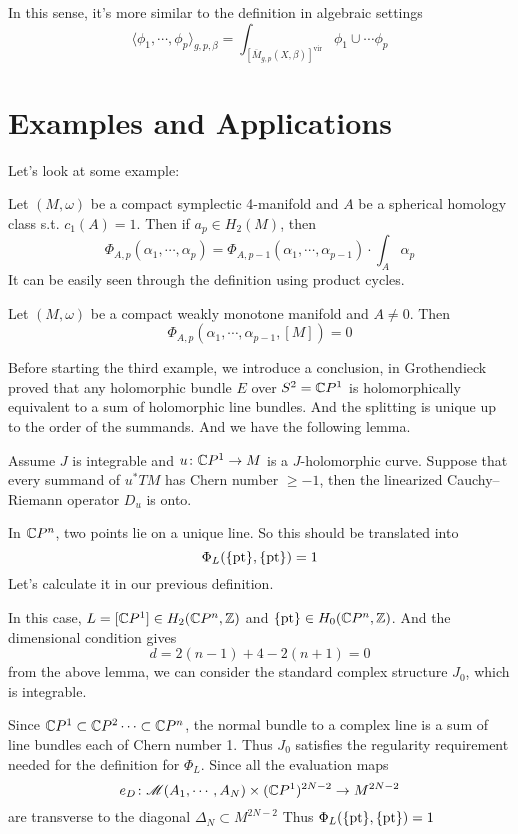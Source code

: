 \documentclass[twoside]{article}
\begin{document}
In this sense, it's more similar to the definition in algebraic settings
\[\langle \phi_1,\cdots,\phi_p \rangle_{g,p,\beta}=\int_{\left[\overline{M}_{g,p}(X,\beta)\right]^{\textrm{vir}}} \phi_1\cup\cdots\phi_p \]

\section{Examples and Applications}

Let's look at some example:

\begin{example}
    Let $(M,\omega)$ be a compact symplectic 4-manifold and $A$ be a spherical homology class 
    s.t. $c_1(A)=1$. Then if $a_p\in H_2(M)$, then
    \[\Phi_{A,p}(\alpha_1,\cdots,\alpha_p)=\Phi_{A,p-1}(\alpha_1,\cdots,\alpha_{p-1})\cdot \int_A \alpha_p\]
    It can be easily seen through the definition using product cycles.
\end{example}

\begin{example}
    Let $(M,\omega)$ be a compact weakly monotone manifold and $A\neq 0$. Then
    \[\Phi_{A,p}(\alpha_1,\cdots,\alpha_{p-1},[M])=0\]
\end{example}

Before starting the third example, we introduce a conclusion, 
in \cite{grothendieck} Grothendieck proved that 
any holomorphic bundle $E$ over $S^2=\mathbb{C}P^{1}$ 
is holomorphically equivalent to a sum of holomorphic line bundles. 
And the splitting is unique up to the order of the summands. 
And we have the following lemma.

\begin{lemma}
    Assume $J$ is integrable and $u\colon \mathbb{C}P^{1}\rightarrow M$ is a $J$-holomorphic curve. 
    Suppose that every summand of $u^*TM$ has Chern number $\geq -1$, 
    then the linearized Cauchy--Riemann operator $D_u$ is onto.
\end{lemma}

\begin{example}
    In $\mathbb{C}P^{n}$, two points lie on a unique line. So this should be translated into
    \[\Phi_L(\{\operatorname{pt}\},\{\operatorname{pt}\})=1\]
    Let's calculate it in our previous definition.
    
    In this case, $L=[\mathbb{C}P^{1}]\in H_2(\mathbb{C}P^{n},\mathbb{Z})$ and $\{\operatorname{pt}\}\in H_0(\mathbb{C}P^{n},\mathbb{Z})$. 
    And the dimensional condition gives
    \[d=2(n-1)+4-2(n+1)=0\]
    from the above lemma, we can consider the standard complex structure $J_0$, which is integrable.
    
    Since $\mathbb{C}P^{1}\subset\mathbb{C}P^{2}\cdots\subset\mathbb{C}P^{n}$, 
    the normal bundle to a complex line is a sum of line bundles each of Chern number 1. 
    Thus $J_0$ satisfies the regularity requirement needed for the definition for $\Phi_L$. 
    Since all the evaluation maps 
    \[e_D\colon \mathscr{M}(A_1,\cdots,A_N)\times(\mathbb{C}P^{1})^{2N-2}\rightarrow M^{2N-2}\]
    are transverse to the diagonal $\Delta_N\subset M^{2N-2}$
    Thus $\Phi_L(\{\operatorname{pt}\},\{\operatorname{pt}\})=1$ 
\end{example}
\end{document}
